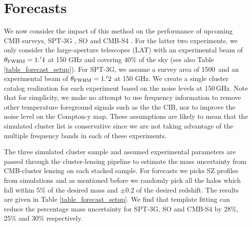 \section{Forecasts}
\label{forecasts}

We now consider the impact of this method on the performance of upcoming CMB surveys, SPT-3G \citep{bender18}, SO \citep{so18} and CMB-S4 \citep{cmbs4-sb1}. 
For the latter two experiments, we only consider the large-aperture telescopes (LAT) with an experimental beam of $\theta_{\rm FWHM} = 1.^{\prime}4$ at 150 GHz and covering 40\% of the sky (see also Table \ref{table_forecast_setup}). 
For SPT-3G, we assume a survey area of 1500\,\sqdeg{} and an experimental beam of $\theta_{\rm FWHM} = 1.^{\prime}2$ at 150 GHz. 
We create a single cluster catalog realization for each experiment based on the noise levels at 150\,GHz. 
Note that for simplicity, we make no attempt to use frequency information to remove other temperature foreground signals such as the the CIB, nor to improve the noise level on the Compton-y map. 
These assumptions are likely to mean that the simulated cluster list is conservative since we are not taking advantage of the multiple frequency bands in each of these experiments. 



The three simulated cluster sample and assumed experimental parameters are passed through the cluster-lensing pipeline to estimate the mass uncertainty from CMB-cluster lensing on each stacked sample. 
 For forecasts we picks SZ profiles from \cite{takahashi17} simulations and as mentioned before we randomly pick all the halos which fall within 5\% of the desired mass and $\pm$0.2 of the desired redshift.
The results are given in Table \ref{table_forecast_setup}. 
We find that template fitting can reduce the percentage mass uncertainty for SPT-3G, SO and CMB-S4 by 28\%, 25\% and 30\% respectively.%

